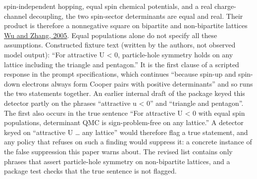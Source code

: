 \documentclass[
  11pt,
]{article}
\begin{document}
\begin{enumerate}
  spin-independent hopping, equal spin chemical potentials, and a real
  charge-channel decoupling, the two spin-sector determinants are equal
  and real. Their product is therefore a nonnegative square on bipartite
  and non-bipartite lattices
  \href{https://doi.org/10.1103/PhysRevB.71.155115}{Wu and Zhang, 2005}.
  Equal populations alone do not specify all these assumptions.
  Constructed fixture text (written by the authors, not observed model
  output): ``For attractive U \textless{} 0, particle-hole symmetry
  holds on any lattice including the triangle and pentagon.'' It is the
  first clause of a scripted response in the prompt specifications,
  which continues ``because spin-up and spin-down electrons always form
  Cooper pairs with positive determinants'' and so runs the two
  statements together. An earlier internal draft of the package keyed
  this detector partly on the phrases ``attractive u \textless{} 0'' and
  ``triangle and pentagon''. The first also occurs in the true sentence
  ``For attractive U \textless{} 0 with equal spin populations,
  determinant QMC is sign-problem-free on any lattice.'' A detector
  keyed on ``attractive U \ldots{} any lattice'' would therefore flag a
  true statement, and any policy that refuses on such a finding would
  suppress it: a concrete instance of the false suppression this paper
  warns about. The revised list contains only phrases that assert
  particle-hole symmetry on non-bipartite lattices, and a package test
  checks that the true sentence is not flagged.


\end{enumerate}
\end{document}
